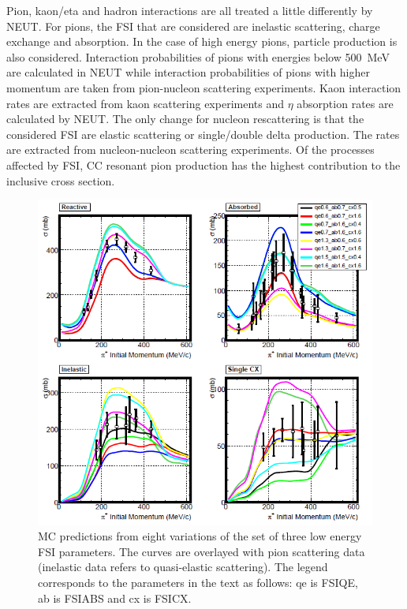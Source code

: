 Pion, kaon/eta and hadron interactions are all treated a little differently by NEUT. For pions, the FSI that are considered are inelastic scattering, charge exchange and absorption. In the case of high energy pions, particle production is also considered. Interaction probabilities of pions with energies below 500~MeV are calculated in NEUT while interaction probabilities of pions with higher momentum are taken from pion-nucleon scattering experiments. Kaon interaction rates are extracted from kaon scattering experiments and $\eta$ absorption rates are calculated by NEUT. The only change for nucleon rescattering is that the considered FSI are elastic scattering or single/double delta production. The rates are extracted from nucleon-nucleon scattering experiments. Of the processes affected by FSI, CC resonant pion production has the highest contribution to the inclusive cross section.

\begin{figure}
\centering
\includegraphics[width=6in]{Figures/fsifit.PNG}
\caption{MC predictions from eight variations of the set of three low energy FSI parameters. The curves are overlayed with pion scattering data (inelastic data refers to quasi-elastic scattering). The legend corresponds to the parameters in the text as follows: qe is FSIQE, ab is FSIABS and cx is FSICX. } 
\label{fig:fsifit}
\end{figure}


